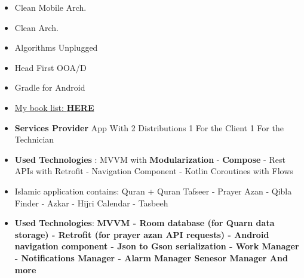 \documentclass[10pt,a4paper,ragged2e,withhyper]{altacv}
\begin{document}
\begin{paracol}{2}
\begin{multicols}{3}
{\small\begin{itemize}
\item[\textcolor{PrimaryColor}{\faBook}] Clean Mobile Arch.
\item[\textcolor{PrimaryColor}{\faBook}] Clean Arch.
\item[\textcolor{PrimaryColor}{\faBook}] Algorithms Unplugged
\item[\textcolor{PrimaryColor}{\faBook}] Head First OOA/D
\item[\textcolor{PrimaryColor}{\faBook}] Gradle for Android
\item[\textcolor{PrimaryColor}{\faTrello}] \href{https://trello.com/b/pkZlgQVu/my-readings-board}{My book list: \textbf{\textcolor{TertiaryColor}{HERE}}}
\end{itemize}}

\end{multicols}

\end{paracol}

\vspace{2px}

\vspace{2px}


\hypertarget{samoolah}{}



\begin{itemize}
\item \textbf{Services Provider} App With 2 Distributions 1 For the Client 1 For the Technician
\item \textbf{Used Technologies} : MVVM with \textbf{Modularization} - \textbf{Compose} - Rest APIs with Retrofit - Navigation Component - Kotlin Coroutines with Flows
\end{itemize}
\divider


\begin{itemize}
\item \textbf{}Islamic application contains:
Quran + Quran Tafseer - Prayer Azan - Qibla Finder - Azkar - Hijri Calendar - Tasbeeh
\item \textbf{Used Technologies}: \textbf{MVVM - Room database (for Quarn data storage) - Retrofit (for prayer azan API requests) - Android navigation component - Json to Gson serialization - Work Manager - Notifications Manager - Alarm Manager Senesor Manager And more}
\end{itemize}
\divider
\end{document}
